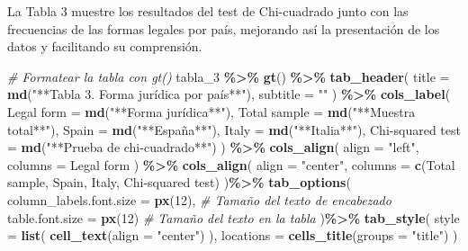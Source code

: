 \documentclass[
]{article}
\newenvironment{Shaded}{\begin{snugshade}}{\end{snugshade}}
\newcommand{\AttributeTok}[1]{\textcolor[rgb]{0.13,0.29,0.53}{#1}}
\newcommand{\CommentTok}[1]{\textcolor[rgb]{0.56,0.35,0.01}{\textit{#1}}}
\newcommand{\DecValTok}[1]{\textcolor[rgb]{0.00,0.00,0.81}{#1}}
\newcommand{\FunctionTok}[1]{\textcolor[rgb]{0.13,0.29,0.53}{\textbf{#1}}}
\newcommand{\NormalTok}[1]{#1}
\newcommand{\OtherTok}[1]{\textcolor[rgb]{0.56,0.35,0.01}{#1}}
\newcommand{\SpecialCharTok}[1]{\textcolor[rgb]{0.81,0.36,0.00}{\textbf{#1}}}
\newcommand{\StringTok}[1]{\textcolor[rgb]{0.31,0.60,0.02}{#1}}
\begin{document}
La Tabla 3 muestre los resultados del test de Chi-cuadrado junto con las
frecuencias de las formas legales por país, mejorando así la
presentación de los datos y facilitando su comprensión.

\begin{Shaded}
\begin{Highlighting}[]
\CommentTok{\# Formatear la tabla con gt()}
\NormalTok{tabla\_3 }\SpecialCharTok{\%\textgreater{}\%}
  \FunctionTok{gt}\NormalTok{() }\SpecialCharTok{\%\textgreater{}\%}
  \FunctionTok{tab\_header}\NormalTok{(}
    \AttributeTok{title =} \FunctionTok{md}\NormalTok{(}\StringTok{"**Tabla 3. Forma jurídica por país**"}\NormalTok{),}
    \AttributeTok{subtitle =} \StringTok{""}
\NormalTok{  ) }\SpecialCharTok{\%\textgreater{}\%}
  \FunctionTok{cols\_label}\NormalTok{(}
    \StringTok{\textasciigrave{}}\AttributeTok{Legal form}\StringTok{\textasciigrave{}} \OtherTok{=} \FunctionTok{md}\NormalTok{(}\StringTok{"**Forma jurídica**"}\NormalTok{),}
    \StringTok{\textasciigrave{}}\AttributeTok{Total sample}\StringTok{\textasciigrave{}} \OtherTok{=} \FunctionTok{md}\NormalTok{(}\StringTok{"**Muestra total**"}\NormalTok{),}
    \AttributeTok{Spain =} \FunctionTok{md}\NormalTok{(}\StringTok{"**España**"}\NormalTok{),}
    \AttributeTok{Italy =} \FunctionTok{md}\NormalTok{(}\StringTok{"**Italia**"}\NormalTok{),}
    \StringTok{\textasciigrave{}}\AttributeTok{Chi{-}squared test}\StringTok{\textasciigrave{}} \OtherTok{=} \FunctionTok{md}\NormalTok{(}\StringTok{"**Prueba de chi{-}cuadrado**"}\NormalTok{)}
\NormalTok{  ) }\SpecialCharTok{\%\textgreater{}\%}
  \FunctionTok{cols\_align}\NormalTok{(}
    \AttributeTok{align =} \StringTok{"left"}\NormalTok{,}
    \AttributeTok{columns =} \StringTok{\textasciigrave{}}\AttributeTok{Legal form}\StringTok{\textasciigrave{}}
\NormalTok{  ) }\SpecialCharTok{\%\textgreater{}\%}
  \FunctionTok{cols\_align}\NormalTok{(}
    \AttributeTok{align =} \StringTok{"center"}\NormalTok{,}
    \AttributeTok{columns =} \FunctionTok{c}\NormalTok{(}\StringTok{\textasciigrave{}}\AttributeTok{Total sample}\StringTok{\textasciigrave{}}\NormalTok{, Spain, Italy, }\StringTok{\textasciigrave{}}\AttributeTok{Chi{-}squared test}\StringTok{\textasciigrave{}}\NormalTok{)}
\NormalTok{  )}\SpecialCharTok{\%\textgreater{}\%}
  \FunctionTok{tab\_options}\NormalTok{(}
    \AttributeTok{column\_labels.font.size =} \FunctionTok{px}\NormalTok{(}\DecValTok{12}\NormalTok{), }\CommentTok{\# Tamaño del texto de encabezado}
    \AttributeTok{table.font.size =} \FunctionTok{px}\NormalTok{(}\DecValTok{12}\NormalTok{) }\CommentTok{\# Tamaño del texto en la tabla}
\NormalTok{  )}\SpecialCharTok{\%\textgreater{}\%}
  \FunctionTok{tab\_style}\NormalTok{(}
    \AttributeTok{style =} \FunctionTok{list}\NormalTok{(}
      \FunctionTok{cell\_text}\NormalTok{(}\AttributeTok{align =} \StringTok{"center"}\NormalTok{)  }
\NormalTok{    ),}
    \AttributeTok{locations =} \FunctionTok{cells\_title}\NormalTok{(}\AttributeTok{groups =} \StringTok{"title"}\NormalTok{)  }
\NormalTok{  )}
\end{Highlighting}
\end{Shaded}
\end{document}
